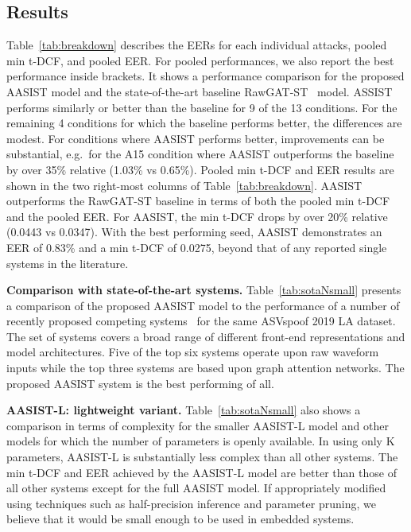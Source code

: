\documentclass{article}
\newcommand{\newpara}[1]{\vspace{8pt}\noindent\textbf{#1}}
\begin{document}
\subsection{Results}
\label{ssec:result}
Table~\ref{tab:breakdown} describes the EERs for each individual attacks, pooled min t-DCF, and pooled EER. 
For pooled performances, we also report the best performance inside brackets. 
It shows a performance comparison for the proposed AASIST model and the state-of-the-art baseline RawGAT-ST~\cite{tak2021end} model. 
ASSIST performs similarly or better than the baseline for 9 of the 13 conditions.  For the remaining 4 conditions for which the baseline performs better, the differences are modest.  For conditions where AASIST performs better, improvements can be substantial, e.g.\ for the A15 condition where AASIST outperforms the baseline by over 35\% relative (1.03\% vs 0.65\%).
Pooled min t-DCF and EER results are shown in the two right-most columns of Table~\ref{tab:breakdown}. AASIST outperforms the RawGAT-ST baseline in terms of both the pooled min t-DCF and the pooled EER.  For AASIST, the min t-DCF drops by over 20\% relative (0.0443 vs 0.0347).
With the best performing seed, AASIST demonstrates an EER of 0.83\% and a min t-DCF of 0.0275, beyond that of any reported single systems in the literature. 

\newpara{Comparison with state-of-the-art systems.}
Table~\ref{tab:sotaNsmall} presents a comparison of the proposed AASIST model to the performance of a number of recently proposed competing systems~\cite{tak2021graph,tak2021end,wang21fa_interspeech,zhang2021effect,hua2021towards,ge2021raw,li2021channelwise,chen2020generalization,luo2021capsule,zhang2021one,li2021replay,ma2021improved,tak2020spoofing,ge2021} for the same ASVspoof 2019 LA dataset. 
The set of systems covers a broad range of different front-end representations and model architectures.
Five of the top six systems operate upon raw waveform inputs while the top three systems are based upon graph attention networks. 
The proposed AASIST system is the best performing of all.

\newpara{AASIST-L: lightweight variant.}
Table~\ref{tab:sotaNsmall} also shows a comparison in terms of complexity for the smaller AASIST-L model and other models for which the number of parameters is openly available. 
In using only K parameters, AASIST-L is substantially less complex than all other systems.
The min t-DCF and EER achieved by the AASIST-L model are better than those of all other systems except for the full AASIST model.
If appropriately modified using techniques such as half-precision inference and parameter pruning, we believe that it would be small enough to be used in embedded systems. 
\end{document}
